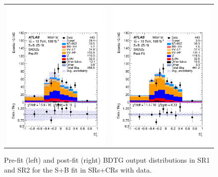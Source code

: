 \begin{figure}[htbp]
\begin{tabular}{cc}
		\includegraphics[width=.45\textwidth]{Chapters/CH8/figures/SPLUSB_CRSR_DL1rc_unblind/Plots/SR2} &
		\includegraphics[width=.45\textwidth]{Chapters/CH8/figures/SPLUSB_CRSR_DL1rc_unblind/Plots/SR2_postFit} \\
	\end{tabular}
	\caption{Pre-fit (left) and post-fit (right) BDTG output distributions in SR1 and SR2 for the S+B \tZc fit in SRs+CRs with data.
		\ErrStatSys
	}%
	\label{fig:stat:tzc:splusb:crsr:srplots:1_unb}
\end{figure}

